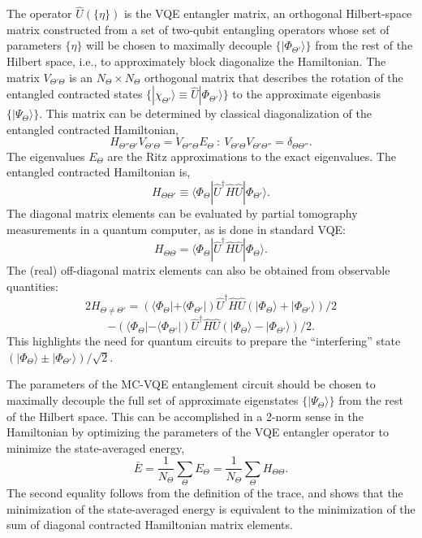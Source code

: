 \documentclass[aps,prl,twocolumn,showpacs,superscriptaddress,groupedaddress]{revtex4}  %
\begin{document}
The operator $\hat U (\{ \eta \})$ is the VQE entangler matrix, an orthogonal
Hilbert-space matrix constructed from a set of two-qubit entangling operators
whose set of parameters $\{ \eta \}$ will be chosen to maximally decouple $\{ |
\Phi_{\Theta'} \rangle \}$ from the rest of the Hilbert space, i.e., to
approximately block diagonalize the Hamiltonian.  The matrix $V_{\Theta'
\Theta}$ is an $N_{\Theta} \times N_{\Theta}$ orthogonal matrix that describes
the rotation of the entangled contracted states $ \{ | \chi_{\Theta'} \rangle
\equiv \hat U |\Phi_{\Theta'} \rangle \} $ to the approximate eigenbasis $\{ |
\Psi_{\Theta} \rangle \}$. This matrix can be determined by classical
diagonalization of the entangled contracted Hamiltonian,
\begin{equation}
H_{\Theta'' \Theta'}
V_{\Theta' \Theta}
=
V_{\Theta'' \Theta}
E_{\Theta}
\ : \
V_{\Theta' \Theta}
V_{\Theta' \Theta''}
=
\delta_{\Theta \Theta''}
.
\end{equation}
The eigenvalues $E_{\Theta}$ are the Ritz approximations to the exact
eigenvalues. The entangled contracted Hamiltonian is,
\begin{equation}
H_{\Theta \Theta'}
\equiv
\langle \Phi_{\Theta} | \hat U^{\dagger} \hat H \hat U | \Phi_{\Theta'} \rangle
.
\end{equation}
The diagonal matrix elements can be evaluated by partial tomography measurements
in a quantum computer, as is done in standard VQE:
\begin{equation}
\label{eq:Heff}
H_{\Theta \Theta}
=
\langle \Phi_{\Theta} | \hat U^{\dagger} \hat H \hat U | \Phi_{\Theta} \rangle
.
\end{equation}
The (real) off-diagonal matrix elements can also be obtained from observable
quantities:
\[
2 H_{\Theta \neq \Theta'}
=
\left (
\langle \Phi_{\Theta} |
+
\langle \Phi_{\Theta'} |
\right )
\hat U^{\dagger}
\hat H
\hat U
\left (
| \Phi_{\Theta} \rangle
+
| \Phi_{\Theta'} \rangle
\right ) / 2
\]
\begin{equation}
\label{eq:Htrans}
-
\left (
\langle \Phi_{\Theta} |
-
\langle \Phi_{\Theta'} |
\right )
\hat U^{\dagger}
\hat H
\hat U
\left (
| \Phi_{\Theta} \rangle
-
| \Phi_{\Theta'} \rangle
\right ) / 2
.
\end{equation}
This highlights the need for quantum circuits to prepare the ``interfering''
state $(|\Phi_{\Theta} \rangle \pm |\Phi_{\Theta'} \rangle) / \sqrt{2}$. 

The parameters of the MC-VQE entanglement circuit should be chosen to maximally
decouple the full set of approximate eigenstates $\{ | \Psi_{\Theta} \rangle
\}$ from the rest of the Hilbert space. This can be accomplished in a 2-norm
sense in the Hamiltonian by optimizing the parameters of the VQE entangler
operator to minimize the state-averaged energy,
\begin{equation}
\bar{E}
=
\frac{1}{N_{\Theta}}
\sum_{\Theta}
E_{\Theta}
=
\frac{1}{N_{\Theta}}
\sum_{\Theta}
H_{\Theta \Theta}
.
\end{equation}
The second equality follows from the definition of the trace, and shows that the
minimization of the state-averaged energy is equivalent to the minimization of
the sum of diagonal contracted Hamiltonian matrix elements.
\end{document}
